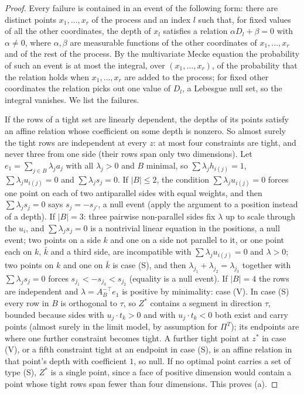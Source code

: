 \documentclass[11pt]{amsart}
\theoremstyle{remark}\newtheorem{remark}[theorem]{Remark}
\begin{document}
\begin{proof}
Every failure is contained in an event of the following form: there are distinct points $x_1,\dots,x_r$ of the process
and an index $l$ such that, for fixed values of all the other coordinates, the depth of $x_l$ satisfies a relation
$\alpha D_l+\beta=0$ with $\alpha\ne0$, where $\alpha,\beta$ are measurable functions of the other coordinates of
$x_1,\dots,x_r$ and of the rest of the process. By the multivariate Mecke equation \cite[Thm.~4.4]{lp} the probability of
such an event is at most the integral, over $(x_1,\dots,x_r)$, of the probability that the relation holds when
$x_1,\dots,x_r$ are added to the process; for fixed other coordinates the relation picks out one value of $D_l$, a
Lebesgue null set, so the integral vanishes. We list the failures.

If the rows of a tight set are linearly dependent, the depths of its points satisfy an affine relation whose
coefficient on some depth is nonzero. So almost surely the tight rows are independent at every $z$: at most four
constraints are tight, and never three from one side (their rows span only two dimensions). Let
$e_1=\sum_{j\in B}\lambda_ja_j$ with all $\lambda_j>0$ and $B$ minimal, so $\sum\lambda_jh_{i(j)}=1$,
$\sum\lambda_ju_{i(j)}=0$ and $\sum\lambda_js_j=0$. If $|B|\le2$, the condition $\sum\lambda_ju_{i(j)}=0$ forces one point
on each of two antiparallel sides with equal weights, and then $\sum\lambda_js_j=0$ says $s_{j}=-s_{j'}$, a null event
(apply the argument to a position instead of a depth). If $|B|=3$: three pairwise non-parallel sides fix $\lambda$ up to
scale through the $u_i$, and $\sum\lambda_js_j=0$ is a nontrivial linear equation in the positions, a null event; two
points on a side $k$ and one on a side not parallel to it, or one point each on $k$, $\bar k$ and a third side, are
incompatible with $\sum\lambda_ju_{i(j)}=0$ and $\lambda>0$; two points on $k$ and one on $\bar k$ is case (S), and then
$\lambda_{j_1}+\lambda_{j_2}=\lambda_{j_3}$ together with $\sum\lambda_js_j=0$ forces $s_{j_1}<-s_{j_3}<s_{j_2}$
(equality is a null event). If $|B|=4$ the rows are independent and $\lambda=A_B^{-\top}e_1$ is positive by
minimality: case (V). In case (S) every row in $B$ is orthogonal to $\tau$, so $Z^*$ contains a segment in direction
$\tau$, bounded because sides with $u_j\cdot t_k>0$ and with $u_j\cdot t_k<0$ both exist and carry points (almost
surely in the limit model, by assumption for $\Pi^T$); its endpoints are where one
further constraint becomes tight. A further tight point at $z^*$ in case (V), or a fifth constraint tight at an
endpoint in case (S), is an affine relation in that point's depth with coefficient $1$, so null. If no optimal point
carries a set of type (S), $Z^*$ is a single point, since a face of positive dimension would contain a point whose
tight rows span fewer than four dimensions. This proves (a).


\end{proof}
\end{document}
